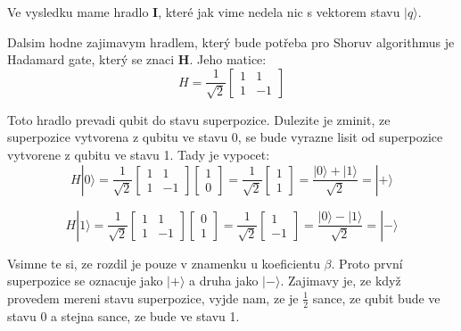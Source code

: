 \documentclass[12pt]{article}
\begin{document}
\par Ve vysledku mame hradlo \textbf{I}, které jak vime nedela nic s vektorem stavu $|q\rangle$.
\par Dalsim hodne zajimavym hradlem, který bude potřeba pro Shoruv algorithmus je Hadamard gate, který se znaci \textbf{H}. Jeho matice:
$$H = \frac{1}{\sqrt{2}}\begin{bmatrix}
        1 & 1  \\
        1 & -1
    \end{bmatrix}$$
\par Toto hradlo prevadi qubit do stavu superpozice. Dulezite je zminit, ze superpozice vytvorena z qubitu ve stavu 0, se bude vyrazne lisit od superpozice vytvorene z qubitu ve stavu 1.
Tady je vypocet:
$$H|0\rangle = \frac{1}{\sqrt{2}}\begin{bmatrix}
        1 & 1  \\
        1 & -1
    \end{bmatrix}\begin{bmatrix}
        1 \\
        0
    \end{bmatrix} = \frac{1}{\sqrt{2}}\begin{bmatrix}
        1 \\
        1
    \end{bmatrix} = \frac{|0\rangle + |1\rangle}{\sqrt{2}} = |+\rangle$$

$$H|1\rangle = \frac{1}{\sqrt{2}}\begin{bmatrix}
        1 & 1  \\
        1 & -1
    \end{bmatrix}\begin{bmatrix}
        0 \\
        1
    \end{bmatrix} = \frac{1}{\sqrt{2}}\begin{bmatrix}
        1 \\
        -1
    \end{bmatrix} = \frac{|0\rangle - |1\rangle}{\sqrt{2}} = |-\rangle$$

\par Vsimne te si, ze rozdil je pouze v znamenku u koeficientu $\beta$. Proto první superpozice se oznacuje jako $|+\rangle$ a druha jako $|-\rangle$.
Zajimavy je, ze když provedem mereni stavu superpozice, vyjde nam, ze je $\frac{1}{2}$ sance, ze qubit bude ve stavu 0 a stejna sance, ze bude ve stavu 1.
\end{document}
